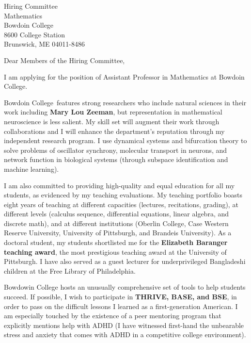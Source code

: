 \documentclass[11pt,a4paper]{letter}
\begin{document}
\def\School{Bowdoin College}
\begin{letter}
{Hiring Committee\\
Mathematics\\
Bowdoin College\\
8600 College Station\\
Brunswick, ME 04011-8486}


\opening{Dear Members of the Hiring Committee,}

I am applying for the position of Assistant Professor in Mathematics at \School. 



\School~features strong researchers who include natural sciences in their work including \textbf{Mary Lou Zeeman}, but representation in mathematical neuroscience is less salient. My skill set will augment their work through collaborations and I will enhance the department’s reputation through my independent research program. I use dynamical systems and bifurcation theory to solve problems of oscillator synchrony, molecular transport in neurons, and network function in biological systems (through subspace identification and machine learning).

I am also committed to providing high-quality and equal education for all my students, as evidenced by my teaching evaluations. My teaching portfolio boasts eight years of teaching at different capacities (lectures, recitations, grading), at different levels (calculus sequence, differential equations, linear algebra, and discrete math), and at different institutions (Oberlin College, Case Western Reserve University, University of Pittsburgh, and Brandeis University). As a doctoral student, my students shortlisted me for the \textbf{Elizabeth Baranger teaching award}, the most prestigious teaching award at the University of Pittsburgh. I have also served as a guest lecturer for underprivileged Bangladeshi children at the Free Library of Philadelphia.

Bowdowin College hosts an unusually comprehensive set of tools to help students succeed. If possible, I wish to participate in \textbf{THRIVE, BASE, and BSE}, in order to pass on the difficult lessons I learned as a first-generation American. I am especially touched by the existence of a peer mentoring program that explicitly mentions help with ADHD (I have witnessed first-hand the unbearable stress and anxiety that comes with ADHD in a competitive college environment).


\end{letter}
\end{document}
